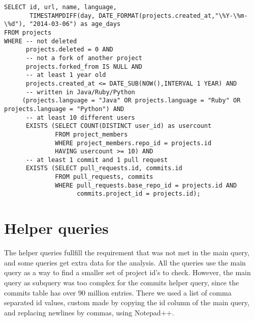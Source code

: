 \documentclass[a4paper,11pt]{article}
\begin{document}
	{\scriptsize
	\begin{verbatim}
SELECT id, url, name, language, 
       TIMESTAMPDIFF(day, DATE_FORMAT(projects.created_at,"\%Y-\%m-\%d"), "2014-03-06") as age_days 
FROM projects 
WHERE -- not deleted
      projects.deleted = 0 AND 
      -- not a fork of another project
      projects.forked_from IS NULL AND 
      -- at least 1 year old
      projects.created_at <= DATE_SUB(NOW(),INTERVAL 1 YEAR) AND 
      -- written in Java/Ruby/Python
     (projects.language = "Java" OR projects.language = "Ruby" OR projects.language = "Python") AND 
      -- at least 10 different users
      EXISTS (SELECT COUNT(DISTINCT user_id) as usercount 
              FROM project_members 
              WHERE project_members.repo_id = projects.id  
              HAVING usercount >= 10) AND 
      -- at least 1 commit and 1 pull request
      EXISTS (SELECT pull_requests.id, commits.id 
              FROM pull_requests, commits 
              WHERE pull_requests.base_repo_id = projects.id AND 
                    commits.project_id = projects.id);
	\end{verbatim}
	}
	
	\section{Helper queries}
	\label{app:helpquery}
	The helper queries fullfill the requirement that was not met in the main query, and some queries get extra data for the analysis. All the queries use the main query as a way to find a smaller set of project id's to check. However, the main query as subquery was too complex for the commits helper query, since the commits table has over 90 million entries. There we used a list of comma separated id values, custom made by copying the id column of the main query, and replacing newlines by commas, using Notepad++.
	
\end{document}
